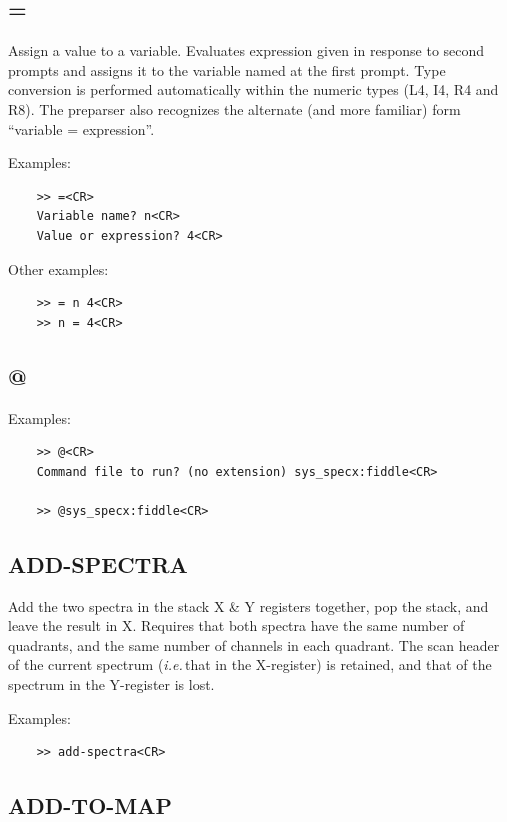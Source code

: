 \documentclass[11pt,twoside]{report}
\newcommand{\ie}{{\it i.e.\,}}
\begin{document}
\subsection{=} \index{=} 

Assign a value to a variable. Evaluates expression given in response to
second prompts and assigns it to the variable named at the first prompt.
Type conversion is performed automatically within the numeric types (L4, I4,
R4 and R8). The preparser also recognizes the alternate (and more familiar)
form ``variable = expression''.

Examples:
\begin{verbatim}
    >> =<CR>
    Variable name? n<CR>
    Value or expression? 4<CR>
\end{verbatim}
Other examples:
\begin{verbatim}
    >> = n 4<CR>
    >> n = 4<CR>
\end{verbatim}

\subsection{@}  
Examples:
\begin{verbatim}
    >> @<CR>
    Command file to run? (no extension) sys_specx:fiddle<CR>

    >> @sys_specx:fiddle<CR>
\end{verbatim}

\subsection{ADD-SPECTRA} 

Add the two spectra in the stack X \& Y registers together, pop the stack,
and leave the result in X. Requires that both spectra have the same number
of quadrants, and the same number of channels in each quadrant. The scan
header of the current spectrum (\ie that in the X-register) is retained,
and that of the spectrum in the Y-register is lost.

Examples:
\begin{verbatim}
    >> add-spectra<CR>
\end{verbatim}

\subsection{ADD-TO-MAP} 
\end{document}
